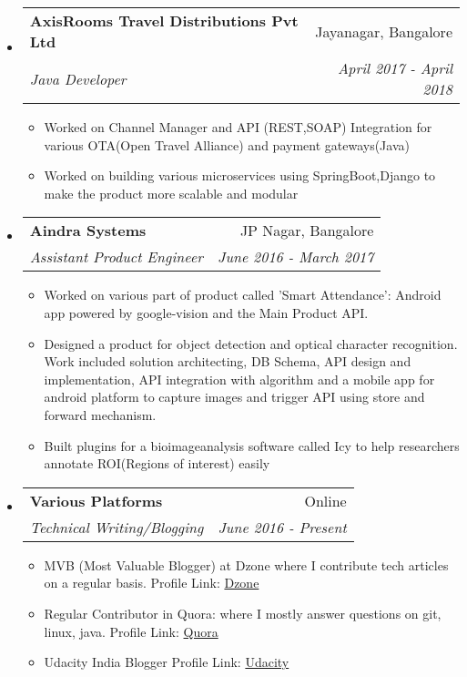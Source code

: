 \documentclass[letterpaper,11pt]{article}
\makeatletter
\newcommand{\resitem}[1]{\item #1 \vspace{-2pt}}
\newcommand{\ressubheading}[4]{
\begin{tabular*}{6.5in}{l@{\extracolsep{\fill}}r}
		\textbf{#1} & #2 \\
		\textit{#3} & \textit{#4} \\
\end{tabular*}\vspace{-6pt}}
\makeatother
\begin{document}
\begin{itemize}
\item
	\ressubheading{AxisRooms Travel  Distributions Pvt Ltd}{Jayanagar, Bangalore}{Java Developer}{April 2017 - April 2018}
	\begin{itemize}
		\resitem{Worked on Channel Manager and API (REST,SOAP) Integration for various OTA(Open Travel Alliance) and  payment gateways(Java)}
		\resitem{Worked on building various microservices using SpringBoot,Django to make the product more scalable and modular}
	\end{itemize}
\end{itemize}


\begin{itemize}
\item
	\ressubheading{Aindra Systems}{JP Nagar, Bangalore}{Assistant Product Engineer}{June 2016 - March 2017}
	\begin{itemize}
		\resitem{Worked on various part of product called 'Smart Attendance': Android app powered by google-vision and the Main Product API.} 
		\resitem{Designed a product for object detection and optical character recognition. Work included solution architecting, DB Schema, API design and implementation, API integration with algorithm and a mobile app for android platform to capture images and trigger API using store and forward mechanism.}
		\resitem{Built plugins for a bioimageanalysis software called Icy to help researchers annotate ROI(Regions of interest) easily}
		\end{itemize}
\end{itemize}


\begin{itemize}
\item
	\ressubheading{Various Platforms}{Online}{Technical Writing/Blogging}{June 2016 - Present}
	\begin{itemize}
		\resitem{MVB (Most Valuable Blogger) at Dzone where I contribute tech articles on a regular basis.
		Profile Link: \href{https://dzone.com/users/3081568/sudip-bhandari.html}{Dzone}} 
		\resitem{Regular Contributor in Quora: where I mostly answer questions on git, linux, java. 
		Profile Link: \href{https://www.quora.com/profile/Sudip-Bhandari}{Quora}}
		\resitem{Udacity India Blogger}{I contribute articles related to Machine Learning}
		Profile Link: \href{https://medium.com/@UdacityINDIA/difference-between-machine-learning-deep-learning-and-artificial-intelligence-d005ae5f23c}{Udacity}
		\end{itemize}
\end{itemize}
\end{document}
